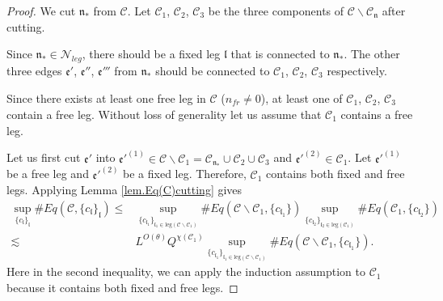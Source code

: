 \begin{proof}
    We cut $\mathfrak{n}_*$ from $\mathcal{C}$. Let $\mathcal{C}_1$, $\mathcal{C}_2$, $\mathcal{C}_3$ be the three components of $\mathcal{C}\backslash \mathcal{C}_{\mathfrak{n}}$ after cutting.
    
    Since $\mathfrak{n}_*\in \mathcal{N}_{leg}$, there should be a fixed leg $\mathfrak{l}$ that is connected to $\mathfrak{n}_*$. The other three edges $\mathfrak{e}'$, $\mathfrak{e}''$, $\mathfrak{e}'''$ from $\mathfrak{n}_*$ should be connected to $\mathcal{C}_1$, $\mathcal{C}_2$, $\mathcal{C}_3$ respectively. 
    
    Since there exists at least one free leg in $\mathcal{C}$ ($n_{\textit{fr}}\ne 0$), at least one of $\mathcal{C}_1$, $\mathcal{C}_2$, $\mathcal{C}_3$ contain a free leg. Without loss of generality let us assume that $\mathcal{C}_1$ contains a free leg.
    
    Let us first cut $\mathfrak{e}'$ into $\mathfrak{e}'^{(1)}\in \mathcal{C}\backslash\mathcal{C}_1=\mathcal{C}_{\mathfrak{n}_*}\cup \mathcal{C}_2\cup \mathcal{C}_3$ and $\mathfrak{e}'^{(2)}\in \mathcal{C}_1$. Let $\mathfrak{e}'^{(1)}$ be a free leg and $\mathfrak{e}'^{(2)}$ be a fixed leg. Therefore, $\mathcal{C}_1$ contains both fixed and free legs. Applying Lemma \ref{lem.Eq(C)cutting} gives
    \begin{equation}\label{eq.case2expand}
    \begin{split}
     \sup_{\{c_{\mathfrak{l}}\}_{\mathfrak{l}}}\#Eq(\mathcal{C},\{c_{\mathfrak{l}}\}_{\mathfrak{l}})\le&
     \sup_{\{c_{\mathfrak{l}_1}\}_{\mathfrak{l}_1\in \text{leg}(\mathcal{C}\backslash\mathcal{C}_1)} } \# Eq(\mathcal{C}\backslash\mathcal{C}_1,\{c_{\mathfrak{l}_1}\}) \sup_{\{c_{\mathfrak{l}_2}\}_{\mathfrak{l}_2\in \text{leg}(\mathcal{C}_1)} }\# Eq(\mathcal{C}_{1}, \{c_{\mathfrak{l}_2}\})
     \\
     \lesssim& L^{O(\theta)} Q^{\chi(\mathcal{C}_1)}\sup_{\{c_{\mathfrak{l}_1}\}_{\mathfrak{l}_1\in \text{leg}(\mathcal{C}\backslash\mathcal{C}_1)} } \# Eq(\mathcal{C}\backslash\mathcal{C}_1,\{c_{\mathfrak{l}_1}\}).
    \end{split}
    \end{equation}
    Here in the second inequality, we can apply the induction assumption to $\mathcal{C}_1$ because it contains both fixed and free legs.
    

\end{proof}
